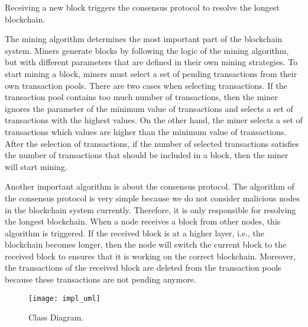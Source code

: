 Receiving a new block triggers the consensus protocol to resolve the longest blockchain.





The mining algorithm determines the most important part of the blockchain system. Miners generate blocks by following the logic of the mining algorithm, but with different parameters that are defined in their own mining strategies. To start mining a block, miners must select a set of pending transactions from their own transaction pools. There are two cases when selecting transactions. If the transaction pool contains too much number of transactions, then the miner ignores the parameter of the minimum value of transactions and selects a set of transactions with the highest values. On the other hand, the miner selects a set of transactions which values are higher than the minimum value of transactions. After the selection of transactions, if the number of selected transactions satisfies the number of transactions that should be included in a block, then the miner will start mining.



Another important algorithm is about the consensus protocol. The algorithm of the consensus protocol is very simple because we do not consider malicious nodes in the blockchain system currently. Therefore, it is only responsible for resolving the longest blockchain. When a node receives a block from other nodes, this algorithm is triggered. If the received block is at a higher layer, i.e., the blockchain becomes longer, then the node will switch the current block to the received block to ensures that it is working on the correct blockchain. Moreover, the transactions of the received block are deleted from the transaction pools because these transactions are not pending anymore.

\clearpage

\begin{figure}[!h]
    \centering
    \texttt{[image: impl\_uml]}
    \caption{Class Diagram.}
    \label{fig:class diagram}
\end{figure}

